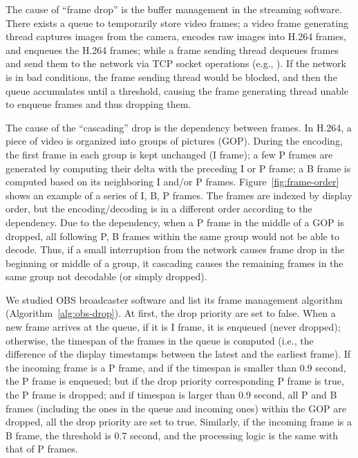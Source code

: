 
The cause of ``frame drop'' is the buffer management in the streaming software. There exists a queue to temporarily store video frames; a video frame generating thread captures images from the camera, encodes raw images into H.264 frames, and enqueues the H.264 frames; while a frame sending thread dequeues frames and send them to the network via TCP socket operations (e.g., \mywrite).
If the network is in bad conditions, the frame sending thread would be blocked, and then the queue accumulates until a threshold, causing the frame generating thread unable to enqueue frames and thus dropping them.



The cause of the ``cascading'' drop is the dependency between frames. In H.264, a piece of video is organized into groups of pictures (GOP). During the encoding, the first frame in each group is kept unchanged (I frame); a few P frames are generated by computing their delta with the preceding I or P frame; a B frame is computed based on its neighboring I and/or P frames. Figure~\ref{fig:frame-order} shows an example of a series of I, B, P frames. The frames are indexed by display order, but the encoding/decoding is in a different order according to the dependency. Due to the dependency, when a P frame in the middle of a GOP is dropped, all following P, B frames within the same group would not be able to decode. Thus, if a small interruption from the network causes frame drop in the beginning or middle of a group, it cascading causes the remaining frames in the same group not decodable (or simply dropped).


We studied OBS broadcaster software and list its frame management algorithm (Algorithm~\ref{alg:obs-drop}). At first, the drop priority are set to false. When a new frame arrives at the queue, if it is I frame, it is enqueued (never dropped); otherwise, the timespan of the frames in the queue is computed (i.e., the difference of the display timestamps between the latest and the earliest frame). If the incoming frame is a P frame, and if the timespan is smaller than 0.9 second, the P frame is enqueued; but if the drop priority corresponding P frame is true, the P frame is dropped; and if timespan is larger than 0.9 second, all P and B frames (including the ones in the queue and incoming ones) within the GOP are dropped, all the drop priority are set to true. Similarly, if the incoming frame is a B frame, the threshold is 0.7 second, and the processing logic is the same with that of P frames.


